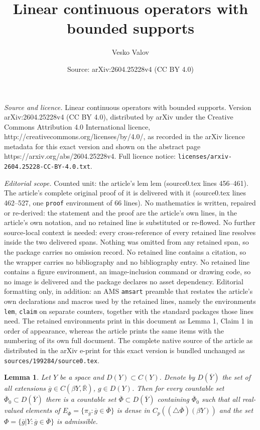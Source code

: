 \documentclass[10pt,a4paper]{amsart}
\title{Linear continuous operators with bounded supports}
\author{Vesko Valov}
\date{Source: arXiv:2604.25228v4 (CC BY 4.0)}
\newtheorem{lem}{Lemma}
\begin{document}
\maketitle

\noindent\emph{Source and licence.} Linear continuous operators with bounded supports. Version arXiv:2604.25228v4 (CC BY 4.0), distributed by arXiv under the Creative Commons Attribution 4.0 International licence, http://creativecommons.org/licenses/by/4.0/, as recorded in the arXiv licence metadata for this exact version and shown on the abstract page https://arxiv.org/abs/2604.25228v4. Full licence notice: \texttt{licenses/arxiv-2604.25228-CC-BY-4.0.txt}.\par\smallskip

\noindent\textit{Editorial scope.} Counted unit: the article's lem lem (source0.tex lines 456--461). The article's complete original proof of it is delivered with it (source0.tex lines 462--527, one \texttt{proof} environment of 66 lines). No mathematics is written, repaired or re-derived: the statement and the proof are the article's own lines, in the article's own notation, and no retained line is substituted or re-flowed.  No further source-local context is needed: every cross-reference of every retained line resolves inside the two delivered spans.  Nothing was omitted from any retained span, so the package carries no omission record.  No retained line contains a citation, so the wrapper carries no bibliography and no bibliography entry.  No retained line contains a figure environment, an image-inclusion command or drawing code, so no image is delivered and the package declares no asset dependency.  Editorial formatting only, in addition: an AMS \texttt{amsart} preamble that restates the article's own declarations and macros used by the retained lines, namely the environments \texttt{lem}, \texttt{claim} on separate counters, together with the standard packages those lines need.  The retained environments print in this document as Lemma 1, Claim 1 in order of appearance, whereas the article prints the same items with the numbering of its own full document.  The complete native source of the article as distributed in the arXiv e-print for this exact version is bundled unchanged as \texttt{sources/199284/source0.tex}.
\begin{lem}
Let $Y$ be a space and $D(Y)\subset C(Y)$. Denote by $D(\overline Y)$ the set of all extensions $\overline g\in C(\beta Y,\overline{\mathbb R})$, $g\in D(Y)$.
Then for every countable 
set $\overline\Phi_0\subset D(\overline Y)$ there is  a countable set $\overline\Phi\subset D(\overline Y)$ containing $\overline\Phi_0$ such that all real-valued elements of $E_{\overline\Phi}=\{\pi_{\overline g}: \overline g\in\overline\Phi\}$ is dense in
$C_p((\triangle\overline\Phi)(\beta Y))$ and the set $\Phi=\{\overline g|Y:\overline g\in\overline\Phi\}$ is admissible. 
\end{lem}
\end{document}
